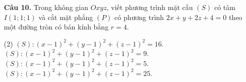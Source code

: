 \documentclass[12pt, a4paper]{article}
\begin{document}
\begin{enumerate}[label=\textbf{\arabic*.}, wide=0pt, leftmargin=*]
    \item[\textbf{Câu 10.}] Trong không gian \(Oxyz\), viết phương trình mặt cầu \((S)\) có tâm \(I(1;1;1)\) và cắt mặt phẳng \((P)\) có phương trình \(2x+y+2z+4=0\) theo một đường tròn có bán kính bằng \(r=4\).
    \begin{tasks}(2)
        \task \((S): (x-1)^2+(y-1)^2+(z-1)^2 = 16\).
        \task \((S): (x-1)^2+(y-1)^2+(z-1)^2 = 9\).
        \task \((S): (x-1)^2+(y-1)^2+(z-1)^2 = 5\).
        \task \((S): (x-1)^2+(y-1)^2+(z-1)^2 = 25\).
    \end{tasks}
    
\end{enumerate}
\end{document}
